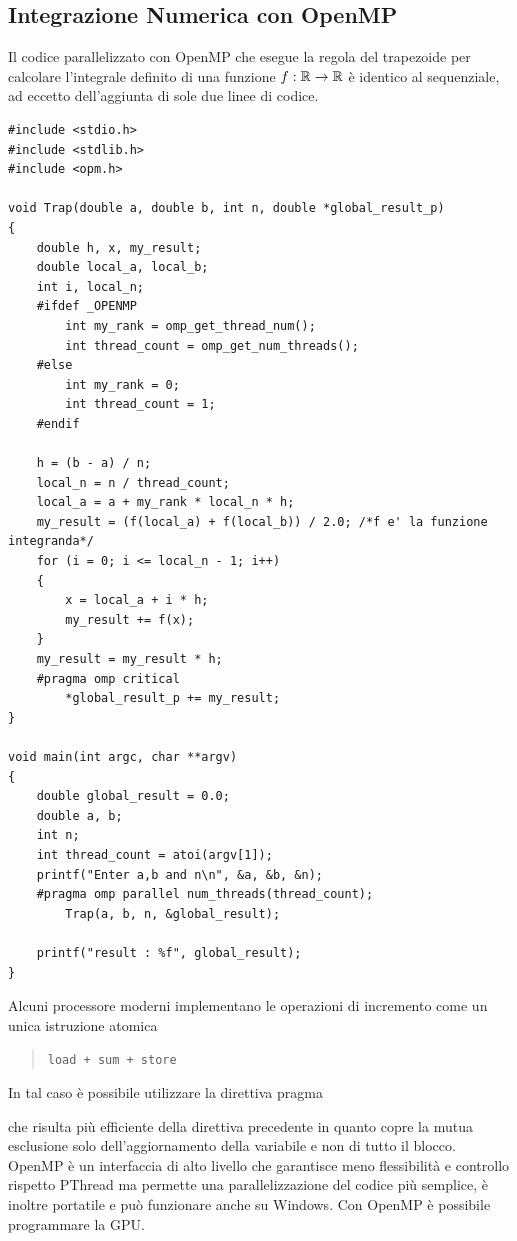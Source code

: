 \documentclass[10pt, letterpaper]{report}
\begin{document}
\subsection{Integrazione Numerica con OpenMP}
Il codice parallelizzato con OpenMP che esegue la regola del trapezoide per calcolare l'integrale definito di una funzione $f:{\mathbb R}\rightarrow {\mathbb R}$ è identico al sequenziale, ad eccetto dell'aggiunta di sole due linee di codice.
\begin{lstlisting}[style=CStyle]
#include <stdio.h>
#include <stdlib.h>
#include <opm.h>

void Trap(double a, double b, int n, double *global_result_p)
{
    double h, x, my_result;
    double local_a, local_b;
    int i, local_n;
    #ifdef _OPENMP
        int my_rank = omp_get_thread_num();
        int thread_count = omp_get_num_threads();
    #else
        int my_rank = 0;
        int thread_count = 1;
    #endif

    h = (b - a) / n;
    local_n = n / thread_count;
    local_a = a + my_rank * local_n * h;
    my_result = (f(local_a) + f(local_b)) / 2.0; /*f e' la funzione integranda*/
    for (i = 0; i <= local_n - 1; i++)
    {
        x = local_a + i * h;
        my_result += f(x);
    }
    my_result = my_result * h;
    #pragma omp critical
        *global_result_p += my_result;
}

void main(int argc, char **argv)
{
    double global_result = 0.0;
    double a, b;
    int n;
    int thread_count = atoi(argv[1]);
    printf("Enter a,b and n\n", &a, &b, &n);
    #pragma omp parallel num_threads(thread_count);
        Trap(a, b, n, &global_result);

    printf("result : %f", global_result);
}
\end{lstlisting}
Alcuni processore moderni implementano le operazioni di incremento come un unica istruzione atomica \begin{quote}
    \texttt{load + sum + store}
\end{quote}
In tal caso è possibile utilizzare la direttiva pragma \begin{quote}
\end{quote}
che risulta più efficiente della direttiva precedente in quanto copre la mutua esclusione solo dell'aggiornamento della variabile e non di tutto il blocco.\acc 
OpenMP è un interfaccia di alto livello che garantisce meno flessibilità e controllo rispetto PThread ma permette una parallelizzazione del codice più semplice, è inoltre portatile e può funzionare anche su Windows. Con OpenMP è possibile programmare la GPU.
\end{document}

